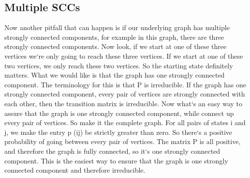 \subsection{Multiple SCCs}
Now another pitfall that can happen is if our underlying graph has multiple strongly connected components, for example in this graph, there are three strongly connected components.
Now look, if we start at one of these three vertices we`re only going to reach these three vertices.
If we start at one of these two vertices, we only reach these two vertices.
So the starting state definitely matters.
What we would like is that the graph has one strongly connected component.
The terminology for this is that P is irreducible.
If the graph has one strongly connected component, every pair of vertices are strongly connected with each other, then the transition matrix is irreducible.
Now what`s an easy way to assure that the graph is one strongly connected component, while connect up every pair of vertices.
So make it the complete graph.
For all pairs of states i and j, we make the entry p (ij) be strictly greater than zero.
So there`s a positive probability of going between every pair of vertices.
The matrix P is all positive, and therefore the graph is fully connected, so it`s one strongly connected component.
This is the easiest way to ensure that the graph is one strongly connected component and therefore irreducible.

